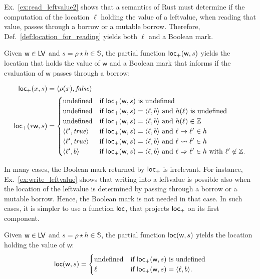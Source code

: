 Ex.~\ref{ex:read_leftvalue2} shows that a semantics of Rust must determine
if the computation of the location $\ell$ holding the value of a leftvalue, when reading that value,
passes through a borrow or a mutable borrow. Therefore, Def.~\ref{def:location_for_reading}
yields both $\ell$ and a Boolean mark.

\begin{definition}\label{def:location_for_reading}
  Given $\mathsf{w}\in\mathsf{LV}$ and $s=\rho\star h\in\mathbb{S}$, the
  partial function $\mathsf{loc_+}(\mathsf{w},s)$ yields the location that holds
  the value of $\mathsf{w}$ and a Boolean mark that informs if the evaluation
  of $\mathsf{w}$ passes through a borrow:

  \begin{align*}
    \mathsf{loc_+}(x,s) &= \langle\rho(x),\mathit{false}\rangle\\
    \mathsf{loc_+}(*\mathsf{w},s) &= \begin{cases}
      \text{undefined} & \text{if $\mathsf{loc_+}(\mathsf{w},s)$ is undefined}\\
      \text{undefined} & \text{if $\mathsf{loc_+}(\mathsf{w},s)=\langle\ell,b\rangle$ and $h(\ell)$ is undefined}\\
      \text{undefined} & \text{if $\mathsf{loc_+}(\mathsf{w},s)=\langle\ell,b\rangle$ and $h(\ell)\in\mathbb{Z}$}\\
      \langle \ell',\mathit{true}\rangle & \text{if $\mathsf{loc_+}(\mathsf{w},s)=\langle\ell,b\rangle$ and $\ell\to\ell'\in h$}\\
      \langle \ell',\mathit{true}\rangle & \text{if $\mathsf{loc_+}(\mathsf{w},s)=\langle\ell,b\rangle$ and $\ell\leadsto\ell'\in h$}\\
      \langle \ell',b\rangle & \text{if $\mathsf{loc_+}(\mathsf{w},s)=\langle\ell,b\rangle$ and $\ell\Rightarrow\ell'\in h$ with $\ell'\not\in\mathbb{Z}$.}
    \end{cases}
  \end{align*}
\end{definition}

\noindent
In many cases, the Boolean mark returned by $\mathsf{loc_+}$ is irrelevant. For instance,
Ex.~\ref{ex:write_leftvalue} shows that writing into a leftvalue is possible also when
the location of the leftvalue is determined by passing through a borrow or a mutable borrow.
Hence, the Boolean mark is not needed in that case. In such cases, it is simpler
to use a function $\mathsf{loc}$, that projects $\mathsf{loc_+}$ on its first component.

\begin{definition}[Location]\label{def:location}
  Given $\mathsf{w}\in\mathsf{LV}$ and $s=\rho\star h\in\mathbb{S}$, the
  partial function $\mathsf{loc}(\mathsf{w},s)$ yields the location holding the value of $\mathsf{w}$:
  \[
    \mathsf{loc}(\mathsf{w},s) = \begin{cases}
      \text{undefined} & \text{if $\mathsf{loc_+}(\mathsf{w},s)$ is undefined}\\
      \ell & \text{if $\mathsf{loc_+}(\mathsf{w},s)=\langle\ell,b\rangle$.}
    \end{cases}
  \]
\end{definition}

